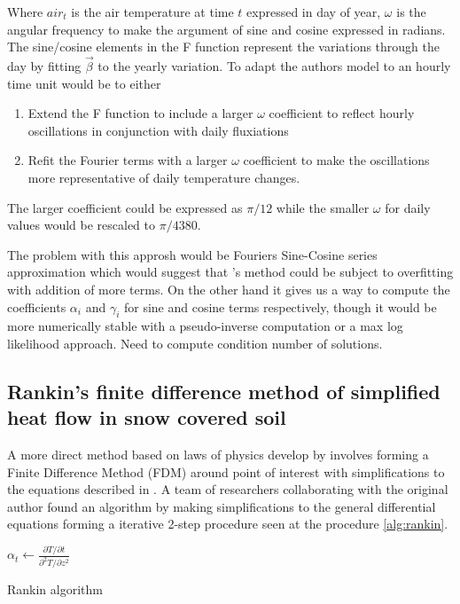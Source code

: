 Where $air_t$ is the air temperature at time $t$ expressed in day of year, $\omega$ is the angular frequency to make the argument of sine and cosine expressed in radians. The sine/cosine elements in the F function represent the variations through the day by fitting $\vec{\beta}$ to the yearly variation. To adapt the authors model to an hourly time unit would be to either
\begin{enumerate}
	\item Extend the F function to include a larger $\omega$ coefficient to reflect hourly oscillations in conjunction with daily fluxiations
	\item Refit the Fourier terms with a larger $\omega$ coefficient to make the oscillations more representative of daily temperature changes.
\end{enumerate}

The larger coefficient could be expressed as $\pi/12$ while the smaller $\omega$ for daily values would be rescaled to $\pi/4380$.

The problem with this approsh would be Fouriers Sine-Cosine series approximation which would suggest that \citeauthor{plauborg_simple_2002}'s method could be subject to overfitting with addition of more terms. On the other hand it gives us a way to compute the coefficients $\alpha_i$ and $\gamma_i$ for sine and cosine terms respectively, though it would be more numerically stable with a pseudo-inverse computation or a max log likelihood approach. \alert{Need to compute condition number of solutions.}

\subsection[Rankin algorithm]{Rankin's finite difference method of simplified heat flow in snow covered soil}\label{sec:theory:rankin}

A more direct method based on laws of physics develop by \citeauthor{karvonen_model_1988} involves forming a Finite Difference Method (FDM) around point of interest with simplifications to the equations described in . A team of researchers collaborating with the original author found an algorithm by making simplifications to the general differential equations forming a iterative 2-step procedure seen at the procedure \ref{alg:rankin}.

\begin{algorithm}[h]
	\SetAlgoLined
	$\alpha_t \gets \frac{\partial T / \partial t}{\partial^2 T / \partial z^2}$\;
	\caption{Rankin algorithm}
	\label{alg:rankin}
\end{algorithm}

